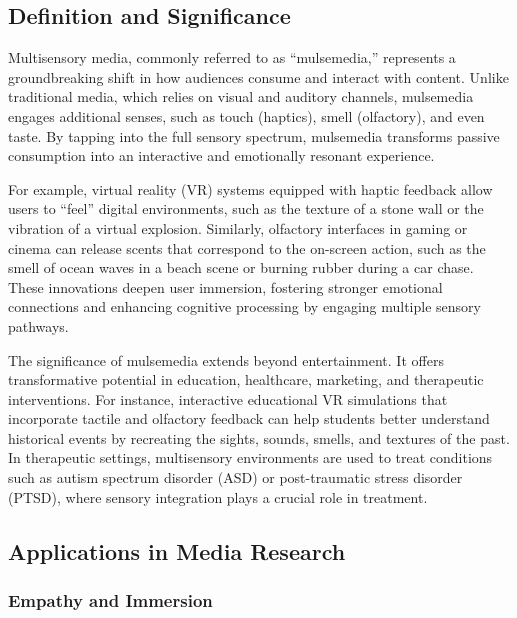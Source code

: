 \documentclass[
]{book}
\begin{document}
\subsection*{Definition and Significance}\label{definition-and-significance}

Multisensory media, commonly referred to as ``mulsemedia,'' represents a groundbreaking shift in how audiences consume and interact with content. Unlike traditional media, which relies on visual and auditory channels, mulsemedia engages additional senses, such as touch (haptics), smell (olfactory), and even taste. By tapping into the full sensory spectrum, mulsemedia transforms passive consumption into an interactive and emotionally resonant experience.

For example, virtual reality (VR) systems equipped with haptic feedback allow users to ``feel'' digital environments, such as the texture of a stone wall or the vibration of a virtual explosion. Similarly, olfactory interfaces in gaming or cinema can release scents that correspond to the on-screen action, such as the smell of ocean waves in a beach scene or burning rubber during a car chase. These innovations deepen user immersion, fostering stronger emotional connections and enhancing cognitive processing by engaging multiple sensory pathways.

The significance of mulsemedia extends beyond entertainment. It offers transformative potential in education, healthcare, marketing, and therapeutic interventions. For instance, interactive educational VR simulations that incorporate tactile and olfactory feedback can help students better understand historical events by recreating the sights, sounds, smells, and textures of the past. In therapeutic settings, multisensory environments are used to treat conditions such as autism spectrum disorder (ASD) or post-traumatic stress disorder (PTSD), where sensory integration plays a crucial role in treatment.

\subsection*{Applications in Media Research}\label{applications-in-media-research}

\subsubsection*{Empathy and Immersion}\label{empathy-and-immersion}
\end{document}
